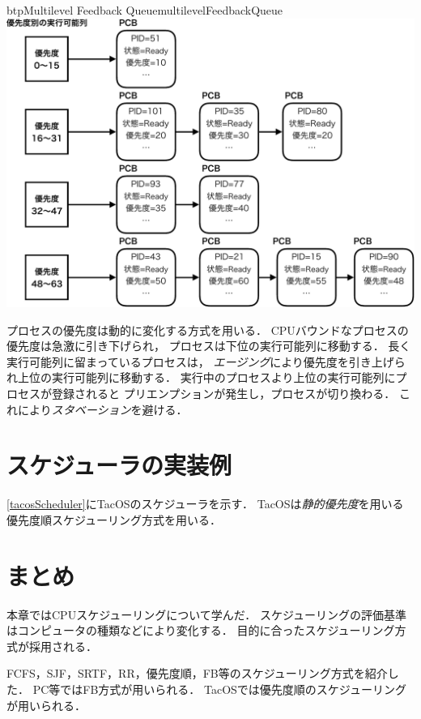 \begin{myfig}{btp}{Multilevel Feedback Queue}{multilevelFeedbackQueue}
  \includegraphics[scale=0.6]{Fig/multilevelFeedbackQueue-crop.pdf}
\end{myfig}

プロセスの優先度は動的に変化する方式を用いる．
CPUバウンドなプロセスの優先度は急激に引き下げられ，
プロセスは下位の実行可能列に移動する．
長く実行可能列に留まっているプロセスは，
\emph{エージング}により優先度を引き上げられ上位の実行可能列に移動する．
実行中のプロセスより上位の実行可能列にプロセスが登録されると
プリエンプションが発生し，プロセスが切り換わる．
これにより\emph{スタベーション}を避ける．

\section{スケジューラの実装例}
\ref{tacosScheduler}にTacOSのスケジューラを示す．
TacOSは\emph{静的優先度}を用いる優先度順スケジューリング方式を用いる．

\section{まとめ}
本章ではCPUスケジューリングについて学んだ．
スケジューリングの評価基準はコンピュータの種類などにより変化する．
目的に合ったスケジューリング方式が採用される．

FCFS，SJF，SRTF，RR，優先度順，FB等のスケジューリング方式を紹介した．
PC等ではFB方式が用いられる．
TacOSでは優先度順のスケジューリングが用いられる．

